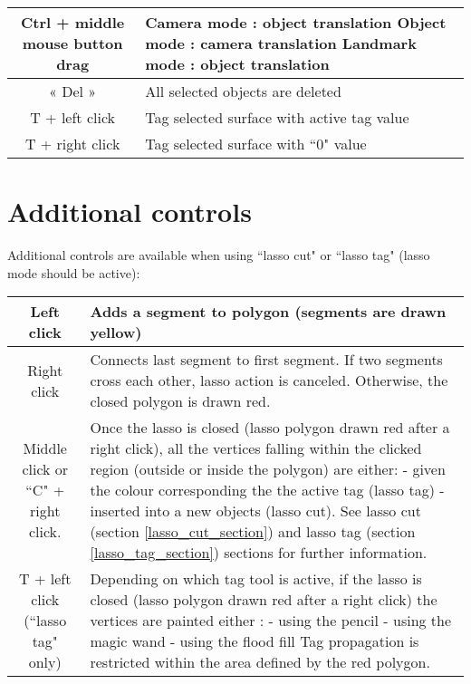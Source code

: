 \begin{tabularx}{\linewidth}{ | c | X | }
Ctrl + middle mouse button drag 
& Camera mode : object translation\newline
Object mode : camera translation\newline
Landmark mode : object translation \\ \hline			

« Del » & All selected objects are deleted \\ \hline			

T + left click & Tag selected surface with active tag value \\ \hline			
 
T + right click & Tag selected surface with ``0" value \\ \hline			

 \end{tabularx}

\section{Additional controls}
Additional controls are available when using ``lasso cut" or ``lasso tag" (lasso mode should be active):\\
\begin{tabularx}{\linewidth}{ | c | X | }
\hline			
Left click & Adds a segment to polygon (segments are drawn yellow) \\ \hline			

Right click & Connects last segment to first segment. If two segments cross each other, lasso action is canceled. Otherwise, the closed polygon is drawn red.\\ \hline			

Middle click or ``C" + right click. & Once the lasso is closed (lasso polygon drawn red
after a right click), all the vertices falling within the clicked region (outside or inside the polygon) are either:\newline
- given the colour corresponding the the active tag (lasso tag)\newline
- inserted into a new objects (lasso cut).\newline 
See lasso cut (section \ref{lasso_cut_section}) and lasso tag (section \ref{lasso_tag_section}) sections for further information.\\ \hline	
		
T + left click (``lasso tag" only) & Depending on which tag tool is active, if the
lasso is closed (lasso polygon drawn red after a right click) the vertices are painted either :\newline 
- using the pencil\newline 
- using the magic wand\newline 
- using the flood fill\newline 
Tag propagation is restricted within the area defined by the red polygon.\\ \hline		
	
\end{tabularx}

